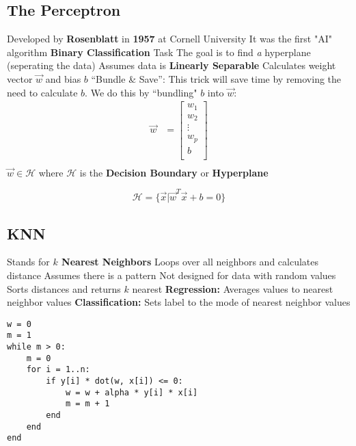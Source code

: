 \subsection{The Perceptron\cite{rosenblatt1958perceptron}}
\begin{outline}
    \1 Developed by \textbf{Rosenblatt} in \textbf{1957} at Cornell University
    \1 It was the first "AI" algorithm
    \1 \textbf{Binary Classification} Task
    \1 The goal is to find \textit{a} hyperplane (seperating the data)
    \1 Assumes data is \textbf{Linearly Separable}
    \1 Calculates weight vector $\vec{w}$ and bias $b$ 
    \1 ``Bundle \& Save'': This trick will save time by removing the need to calculate $b$. We do this by ``bundling" $b$ into $\vec{w}$: 
    \begin{align*}
    \vec{w} &= \begin{bmatrix}
           w_{1}    \\
           w_{2}    \\
           \vdots   \\
           w_{p}    \\
           b        \\
         \end{bmatrix} \\
    \end{align*}
    \1 $\vec{w} \in \mathcal{H}$ where $\mathcal{H}$ is the \textbf{Decision Boundary} or \textbf{Hyperplane}
\end{outline}

\[
\mathcal{H} = \{\vec{x} | \vec{w}^T\vec{x} + b = 0\}
\]

\subsection{KNN\cite{guo2003knn}}
\begin{outline}
    \1 Stands for \textbf{$k$ Nearest Neighbors}
    \1 Loops over all neighbors and calculates distance
    \1 Assumes there is a pattern
    \1 Not designed for data with random values
    \1 Sorts distances and returns $k$ nearest
    \1 \textbf{Regression:} Averages values to nearest neighbor values
    \1 \textbf{Classification:} Sets label to the mode of nearest neighbor values
\end{outline}

\begin{verbatim}
w = 0
m = 1
while m > 0:
    m = 0
    for i = 1..n:
        if y[i] * dot(w, x[i]) <= 0:
            w = w + alpha * y[i] * x[i]
            m = m + 1
        end
    end
end
\end{verbatim}

